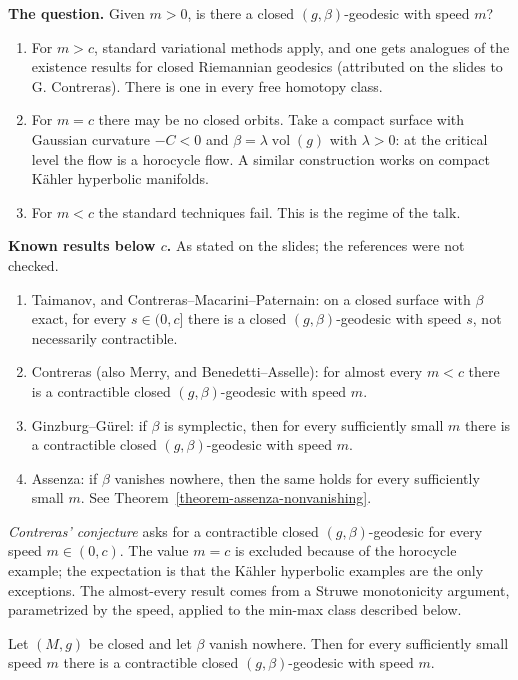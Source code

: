 \medskip\noindent
{\bf The question.} Given $m > 0$, is there
a closed $(g,\beta)$-geodesic with speed
$m$?
\begin{enumerate}
\item For $m > c$, standard variational
methods apply, and one gets analogues of the
existence results for closed Riemannian
geodesics (attributed on the slides to
G. Contreras). There is one in
every free homotopy class.
\item For $m = c$ there may be no closed
orbits. Take a compact surface with
Gaussian curvature $-C < 0$ and $\beta =
\lambda \operatorname{vol}(g)$ with
$\lambda > 0$: at the critical level the
flow is a horocycle flow. A similar
construction works on compact Kähler
hyperbolic manifolds.
\item For $m < c$ the standard techniques
fail. This is the regime of the talk.
\end{enumerate}

\medskip\noindent
{\bf Known results below $c$.} As stated on
the slides; the references were not checked.
\begin{enumerate}
\item Taimanov, and
Contreras--Macarini--Paternain: on a closed
surface with $\beta$ exact, for every
$s \in (0,c]$ there is a closed
$(g,\beta)$-geodesic with speed $s$, not
necessarily contractible.
\item Contreras (also Merry, and
Benedetti--Asselle): for almost every
$m < c$ there is a contractible closed
$(g,\beta)$-geodesic with speed $m$.
\item Ginzburg--Gürel: if $\beta$ is
symplectic, then for every sufficiently
small $m$ there is a contractible closed
$(g,\beta)$-geodesic with speed $m$.
\item Assenza: if $\beta$ vanishes nowhere,
then the same holds for every sufficiently
small $m$. See
Theorem~\ref{theorem-assenza-nonvanishing}.
\end{enumerate}
\emph{Contreras' conjecture} asks for a
contractible closed $(g,\beta)$-geodesic for
every speed $m \in (0,c)$. The value $m = c$
is excluded because of the horocycle
example; the expectation is that the
Kähler hyperbolic examples are the only
exceptions. The almost-every result
comes from a Struwe monotonicity argument,
parametrized by the speed, applied to the
min-max class described below.

\begin{theorem}[Assenza]
\label{theorem-assenza-nonvanishing}
Let $(M,g)$ be closed and let $\beta$ vanish
nowhere. Then for every sufficiently small
speed $m$ there is a contractible closed
$(g,\beta)$-geodesic with speed $m$.
\end{theorem}

